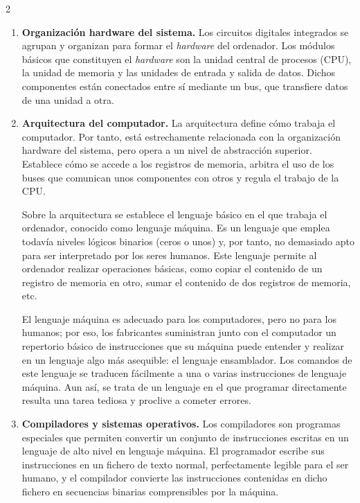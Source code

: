 \begin{paracol}{2}
\begin{enumerate}
\item \textbf{Organización hardware del sistema.}
Los circuitos digitales integrados se agrupan y organizan para formar el \emph{hardware} del ordenador. Los módulos básicos que constituyen el \emph{hardware} son la unidad central de procesos (CPU), la unidad de memoria y las unidades de entrada y salida de datos. Dichos componentes están conectados entre sí mediante un bus, que transfiere datos de una unidad a otra.

\item \textbf{Arquitectura del computador.} 
La arquitectura define cómo trabaja el computador. Por tanto, está estrechamente relacionada con la organización hardware del sistema, pero opera a un nivel de abstracción superior. Establece cómo se accede a los registros de memoria, arbitra el uso de los buses que comunican unos componentes con otros y regula el trabajo de la CPU.

Sobre la arquitectura se establece el lenguaje básico en el que trabaja el ordenador, conocido como lenguaje máquina. Es un lenguaje que emplea todavía niveles lógicos binarios (ceros o unos) y, por tanto, no demasiado apto para ser interpretado por los seres humanos. Este lenguaje permite al ordenador realizar operaciones básicas, como copiar el contenido de un registro de memoria en otro, sumar el contenido de dos registros de memoria, etc.

El lenguaje máquina es adecuado para los computadores, pero no para los humanos; por eso, los fabricantes suministran junto con el computador un repertorio básico de instrucciones que su máquina puede entender y realizar en un lenguaje algo más asequible: el lenguaje ensamblador. Los comandos de este lenguaje se traducen fácilmente a una o varias instrucciones de lenguaje máquina. Aun así, se trata de un lenguaje en el que programar directamente resulta una tarea tediosa y proclive a cometer errores.

\item \textbf{Compiladores y sistemas operativos.}  
Los compiladores son programas especiales que permiten convertir un conjunto de instrucciones escritas en un lenguaje de alto nivel en lenguaje máquina. El programador escribe sus instrucciones en un fichero de texto normal, perfectamente legible para el ser humano, y el compilador convierte las instrucciones contenidas en dicho fichero en secuencias binarias comprensibles por la máquina.


\end{enumerate}
\end{paracol}
